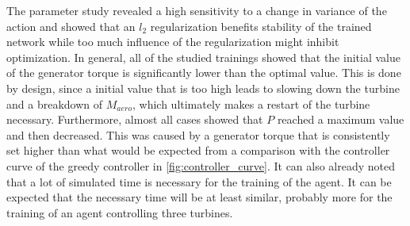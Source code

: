 The parameter study revealed a high sensitivity to a change in variance of the action and showed that an $l_2$ regularization benefits stability of the trained network while too much influence of the regularization might inhibit optimization. In general, all of the studied trainings showed that the initial value of the generator torque is significantly lower than the optimal value. This is done by design, since a initial value that is too high leads to slowing down the turbine and a breakdown of $M_{aero}$, which ultimately makes a restart of the turbine necessary. Furthermore, almost all cases showed that $P$ reached a maximum value and then decreased. This was caused by a generator torque that is consistently set higher than what would be expected from a comparison with the controller curve of the greedy controller in \autoref{fig:controller_curve}. It can also already noted that a lot of simulated time is necessary for the training of the agent. It can be expected that the necessary time will be at least similar, probably more for the training of an agent controlling three turbines.

